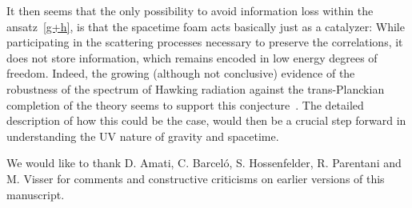 \documentclass[groupedaddress, showpacs, showkeys, onecolumn, nofootinbib, 12pt]{revtex4}
\begin{document}
It then seems that the only possibility to avoid information loss within the ansatz~\eqref{g+h}, is that the spacetime foam acts basically just as a catalyzer: While participating in the scattering processes necessary to preserve the correlations, it does not store information, which remains encoded in low energy degrees of freedom.  Indeed, the growing (although not conclusive) evidence of the robustness of the spectrum of Hawking radiation against  the trans-Planckian completion of the theory seems to support this conjecture~\cite{Unruh:1980cg,Unruh:1994je,Brout:1995wp,Corley:1996ar,Barrabes:1998iw,Parentani:1999qv,Barrabes:2000fr,Parentani:2000ts,Parentani:2007mb,Unruh:2004zk}. The detailed description of how this could be the case, would then be a crucial step forward in understanding the UV nature of gravity and spacetime.

\acknowledgments
We would like to thank D. Amati, C. Barcel\'o, S. Hossenfelder, R. Parentani and M. Visser for comments and constructive criticisms on earlier versions of this manuscript. 
\end{document}
